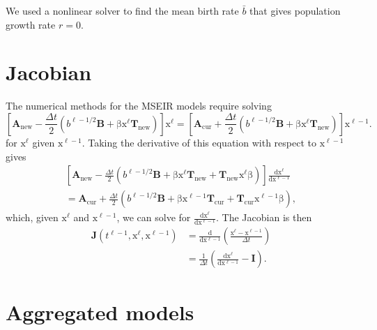 \documentclass[USenglish]{article}
\renewcommand{\vec}[1]{\boldsymbol{\mathrm{#1}}}
\newcommand{\mat}[1]{\mathbf{#1}}
\newcommand{\md}{\mathrm{d}}
\begin{document}
We used a nonlinear solver to find the mean birth rate $\bar{b}$ that
gives population growth rate $r = 0$.


\section{Jacobian}

The numerical methods for the MSEIR models require solving
\begin{equation}
  \label{step}
  \left[
    \mat{A}_{\mathrm{new}}
    - \frac{\Delta t}{2} \left(
      b^{\ell - 1 / 2} \mat{B}
      + \vec{\beta} \vec{x}^{\ell} \mat{T}_{\mathrm{new}}
    \right)
  \right]
  \vec{x}^{\ell}
  =
  \left[
    \mat{A}_{\mathrm{cur}}
    + \frac{\Delta t}{2} \left(
      b^{\ell - 1 / 2} \mat{B}
      + \vec{\beta} \vec{x}^{\ell} \mat{T}_{\mathrm{new}}
    \right)
  \right]
  \vec{x}^{\ell - 1}.
\end{equation}
for $\vec{x}^{\ell}$ given $\vec{x}^{\ell - 1}$.
Taking the derivative of this equation with respect to
$\vec{x}^{\ell - 1}$ gives
\begin{multline}
  \left[
    \mat{A}_{\mathrm{new}}
    - \frac{\Delta t}{2}
    \left(
      b^{\ell - 1 / 2} \mat{B}
      + \vec{\beta} \vec{x}^{\ell} \mat{T}_{\mathrm{new}}
      + \mat{T}_{\mathrm{new}} \vec{x}^{\ell} \vec{\beta}
    \right)
  \right]
  \frac{\md \vec{x}^{\ell}}{\md \vec{x}^{\ell - 1}}
  \\
  = \mat{A}_{\mathrm{cur}}
  + \frac{\Delta t}{2}
  \left(
    b^{\ell - 1 / 2} \mat{B}
    + \vec{\beta} \vec{x}^{\ell - 1} \mat{T}_{\mathrm{cur}}
    + \mat{T}_{\mathrm{cur}} \vec{x}^{\ell - 1} \vec{\beta}
  \right),
\end{multline}
which, given $\vec{x}^{\ell}$ and $\vec{x}^{\ell - 1}$,
we can solve for $\frac{\md \vec{x}^{\ell}}{\md \vec{x}^{\ell - 1}}$.
The Jacobian is then
\begin{equation}
  \begin{split}
    \mat{J}\left(t^{\ell - 1}, \vec{x}^{\ell}, \vec{x}^{\ell - 1}\right)
    &= \frac{\md}{\md \vec{x}^{\ell - 1}}
      \left(
      \frac{\vec{x}^{\ell} - \vec{x}^{\ell - 1}}{\Delta t}
      \right)
    \\
    &= \frac{1}{\Delta t} \left(
      \frac{\md \vec{x}^{\ell}}{\md \vec{x}^{\ell - 1}}
      - \mat{I}
      \right).
  \end{split}
\end{equation}


\section{Aggregated models}
\end{document}
